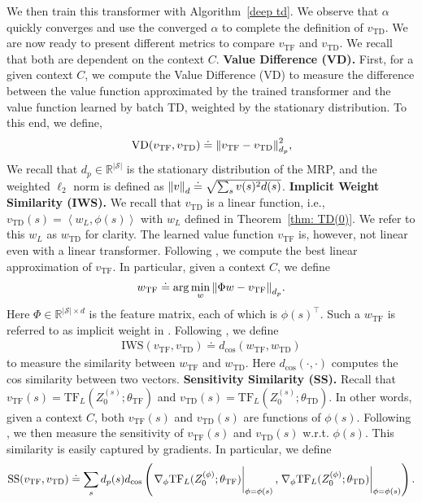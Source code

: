 \documentclass{article}
\newcommand{\fS}{\mathcal{S}}
\newcommand{\R}{\mathbb{R}}
\newcommand{\ns}{{|\fS|}}
\newcommand{\tb}[1]{{\textbf{#1}}}
\newcommand{\indot}[2]{{\left<#1, #2\right>}}
\newcommand{\tf}{\text{TF}}
\newcommand{\td}{\text{TD}}
\begin{document}
We then train this transformer with Algorithm~\ref{deep td}.
We observe that $\alpha$ quickly converges and use the converged $\alpha$ to complete the definition of $v_\td$.
We are now ready to present different metrics to compare $v_\tf$ and $v_\td$.
We recall that both are dependent on the context $C$.
\tb{Value Difference (VD).}
First, for a given context $C$,
we compute the Value Difference (VD) to measure the difference between the value function approximated by the trained transformer and the value function learned by batch TD,
weighted by the stationary distribution.
To this end, we define,
\begin{align}
    \text{VD}(v_\tf, v_\td) \doteq \norm{v_\tf - v_\td}_{d_p}^2,
\end{align}
We recall that $d_p \in \R^\ns$ is the stationary distribution of the MRP, and the weighted $\ell_2$ norm is defined as $\norm{v}_d \doteq \sqrt{\sum_s v(s)^2 d(s)}$.
\tb{Implicit Weight Similarity (IWS).}
We recall that $v_\td$ is a linear function, i.e., $v_\td(s) = \indot{w_L}{\phi(s)}$ with $w_L$ defined in Theorem~\ref{thm: TD(0)}.
We refer to this $w_L$ as $w_\td$ for clarity.
The learned value function $v_\tf$ is, however, not linear even with a linear transformer.
Following \citet{akyurek2023learning},
we compute the best linear approximation of $v_\tf$.
In particular,
given a context $C$,
we define
\begin{align}
    w_\tf \doteq \arg\min_w \norm{\Phi w - v_\tf}_{d_p}.
\end{align}
Here $\Phi \in \R^{\ns \times d}$ is the feature matrix,
each of which is $\phi(s)^\top$.
Such a $w_\tf$ is referred to as implicit weight in \citet{akyurek2023learning}.
Following \citet{akyurek2023learning},
we define
\begin{align}
    \text{IWS}(v_\tf, v_\td) \doteq d_\text{cos}(w_\tf, w_\td)
\end{align}
to measure the similarity between $w_\tf$ and $w_\td$.
Here $d_\text{cos}(\cdot, \cdot)$ computes the cos similarity between two vectors.
\tb{Sensitivity Similarity (SS).}
Recall that $v_{\tf}(s) = \tf_L(Z_0^{(s)}; \theta_\tf)$ and $v_{\td}(s) = \tf_L(Z_0^{(s)}; \theta_{\td})$.
In other words, given a context $C$,
both $v_\tf(s)$ and $v_\td(s)$ are functions of $\phi(s)$.
Following \citet{vonoswald2023transformers},
we then measure the sensitivity of $v_\tf(s)$ and $v_\td(s)$ w.r.t. $\phi(s)$.
This similarity is easily captured by gradients.
In particular,
we define
\begin{align}
    \text{SS}(v_\tf, v_\td) \doteq \sum_s d_p(s) d_\text{cos}\left(\eval{\nabla_{\phi} \tf_L(Z_0^{(\phi)}; \theta_\tf)}_{\phi = \phi(s)}, \eval{\nabla_{\phi} \tf_L(Z_0^{(\phi)}; \theta_\td)}_{\phi = \phi(s)}\right).
\end{align}
\end{document}
